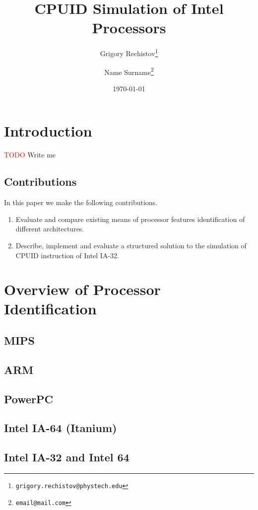 \documentclass[a4paper,10pt,oneside,unicode]{article}
\author{Grigory Rechistov\thanks{\texttt{grigory.rechistov@phystech.edu}} \and Name Surname\thanks{\texttt{email@mail.com}}}
\title{CPUID Simulation of Intel Processors}
\date{\today}
\newcommand{\todo}[1][]{\textcolor{red}{TODO #1}}
\begin{document}
\maketitle

\tableofcontents

\section {Introduction}

\todo{Write me}

\subsection{Contributions}
In this paper we make the following contributions.
\begin{enumerate}
\item Evaluate and compare existing means of processor features identification of different architectures.
\item Describe, implement and evaluate a structured solution to the simulation of CPUID instruction of Intel IA-32.
\end{enumerate}

\section{Overview of Processor Identification}

\subsection{MIPS}
\subsection{ARM}
\subsection{PowerPC}

\subsection{Intel IA-64 (Itanium)}

\cite{itanium-sdm}

\subsection{Intel IA-32 and Intel 64}
\end{document}
